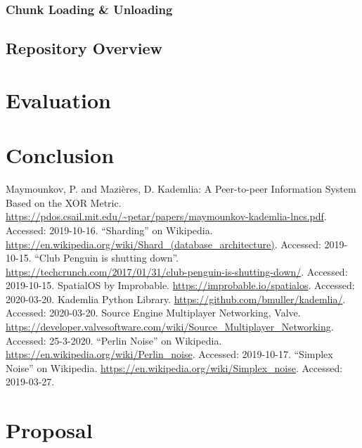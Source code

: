 \documentclass[10pt,twoside,notitlepage,a4paper]{report}
\begin{document}
	\subsection{Chunk Loading \& Unloading}
	\label{sec:loading}
	
	\section{Repository Overview}
	
	\cleardoublepage
	\chapter{Evaluation}
	
	\cleardoublepage
	\chapter{Conclusion}

	\cleardoublepage
	
	\begin{thebibliography}{9}
		 Maymounkov, P. and Mazières, D. Kademlia: A Peer-to-peer Information System Based on the XOR Metric. \url{https://pdos.csail.mit.edu/~petar/papers/maymounkov-kademlia-lncs.pdf}. Accessed: 2019-10-16.
		 ``Sharding'' on Wikipedia. \url{https://en.wikipedia.org/wiki/Shard_(database_architecture)}. Accessed: 2019-10-15.
		 ``Club Penguin is shutting down''. \url{https://techcrunch.com/2017/01/31/club-penguin-is-shutting-down/}. Accessed: 2019-10-15.
		 SpatialOS by Improbable. \url{https://improbable.io/spatialos}. Accessed: 2020-03-20.
		 Kademlia Python Library. \url{https://github.com/bmuller/kademlia/}. Accessed: 2020-03-20.
		 Source Engine Multiplayer Networking, Valve. \url{https://developer.valvesoftware.com/wiki/Source_Multiplayer_Networking}. Accessed: 25-3-2020.
		 ``Perlin Noise'' on Wikipedia. \url{https://en.wikipedia.org/wiki/Perlin_noise}. Accessed: 2019-10-17.
		 ``Simplex Noise'' on Wikipedia.
		\url{https://en.wikipedia.org/wiki/Simplex_noise}. Accessed: 2019-03-27.
	\end{thebibliography}
	\cleardoublepage
	
	\appendix
	
	\chapter{Proposal}
	
\end{document}

